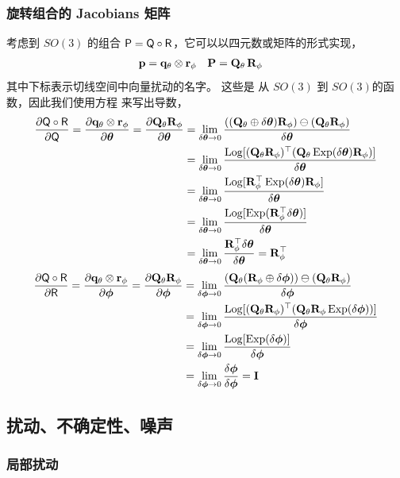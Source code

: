 \subsubsection{旋转组合的 Jacobians 矩阵}

考虑到 $SO(3)$ 的组合 $\mathsf P=\mathsf Q\circ\mathsf R$，它可以以四元数或矩阵的形式实现，
%
\begin{align*}
{\bf p} &= {\bf q}_\theta\otimes{\bf r}_\phi & {\bf P} &= {\bf Q}_\theta\,{\bf R}_\phi
\end{align*}
%
其中下标表示切线空间中向量扰动的名字。 
这些是 从 $SO(3)$ 到 $SO(3)$的函数，因此我们使用方程  来写出导数，
%
\begin{align*}
\frac{\partial\mathsf Q\circ\mathsf R}{\partial\mathsf Q} 
= \frac{\partial{\bf q}_\theta\otimes{\bf r}_\phi}{\partial{\bm \theta}} 
= \frac{\partial{\bf Q}_\theta {\bf R}_\phi}{\partial{\bm \theta}} 
&= \lim_{\delta{\bm \theta}\to 0}\frac{(({\bf Q}_\theta\oplus\delta{\bm \theta}){\bf R}_\phi)\ominus({\bf Q}_\theta{\bf R}_\phi)}{\delta{\bm \theta}} \\
&= \lim_{\delta{\bm \theta}\to 0}\frac{\operatorname*{Log}[({\bf Q}_\theta{\bf R}_\phi)^{\top}({\bf Q}_\theta\operatorname*{Exp}(\delta{\bm \theta}){\bf R}_\phi)]}{\delta{\bm \theta}} \\
&= \lim_{\delta{\bm \theta}\to 0}\frac{\operatorname*{Log}[{\bf R}_\phi^{\top}\operatorname*{Exp}(\delta{\bm \theta}){\bf R}_\phi]}{\delta{\bm \theta}} \\
&= \lim_{\delta{\bm \theta}\to 0}\frac{\operatorname*{Log}[\operatorname*{Exp}({\bf R}_\phi^{\top}\delta{\bm \theta})]}{\delta{\bm \theta}} \\
&= \lim_{\delta{\bm \theta}\to 0}\frac{{\bf R}_\phi^{\top}\delta{\bm \theta}}{\delta{\bm \theta}}  = {\bf R}_\phi^{\top} 
\end{align*}
%
\begin{align*}
\frac{\partial\mathsf Q\circ\mathsf R}{\partial\mathsf R} 
= \frac{\partial{\bf q}_\theta\otimes{\bf r}_\phi}{\partial{\bm \phi}} 
= \frac{\partial{\bf Q}_\theta {\bf R}_\phi}{\partial{\bm \phi}} 
&= \lim_{\delta{\bm \phi}\to 0}\frac{({\bf Q}_\theta({\bf R}_\phi\oplus\delta{\bm \phi}))\ominus({\bf Q}_\theta{\bf R}_\phi)}{\delta{\bm \phi}} \\
&= \lim_{\delta{\bm \phi}\to 0}\frac{\operatorname*{Log}[({\bf Q}_\theta{\bf R}_\phi)^{\top}({\bf Q}_\theta{\bf R}_\phi\operatorname*{Exp}(\delta{\bm \phi}))]}{\delta{\bm \phi}} \\
&= \lim_{\delta{\bm \phi}\to 0}\frac{\operatorname*{Log}[\operatorname*{Exp}(\delta{\bm \phi})]}{\delta{\bm \phi}} \\
&= \lim_{\delta{\bm \phi}\to 0}\frac{\delta{\bm \phi}}{\delta{\bm \phi}}  = {\bf I} 
\end{align*}

\subsection{扰动、不确定性、噪声}

\subsubsection{局部扰动}

